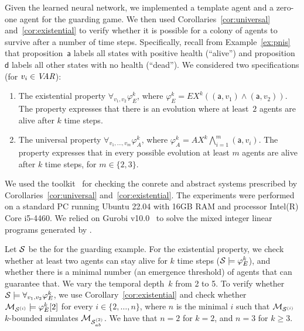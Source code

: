 Given the learned neural network, we implemented a template
agent and a zero-one agent for the guarding game. We then
used Corollaries~\ref{cor:universal}
and~\ref{cor:existential} to verify whether it is possible
for a colony of agents to survive after a number of time
steps.  Specifically, recall from Example~\ref{ex:pnis} that
proposition~$\mathsf{a}$ labels all states with positive
health (``alive'') and proposition $\mathsf{d}$ labels all
other states with no health (``dead'').
We considered two
specifications (for $v_i \in\it{VAR}$):
\begin{enumerate}
    \item The existential property $ \forall_{v_1,
        v_2}\varphi^k_E$, where $\varphi^k_E =   EX^k (
        (\mathsf{a},v_1) \land (\mathsf{a}, v_2))$. The
        property expresses that there is an evolution where
        at least~$2$ agents are alive after $k$ time steps.
\item The universal property $\forall_{v_1,\ldots,v_m}
\varphi^k_A$, where $\varphi^k_A  = AX^k
        \bigwedge_{i=1}^m(\mathsf{a},v_i)$. The property
        expresses that in every possible evolution at least
        $m$ agents are alive after $k$ time steps, for $m
        \in \{2,3\}$.
\end{enumerate}

We used the \venmas toolkit~\cite{Akintunde+20b} for
checking the conrete and abstract systems prescribed by
Corollaries~\ref{cor:universal}
and~\ref{cor:existential}.
The experiments %
were performed on a standard PC running Ubuntu 22.04 with 16GB RAM and
processor Intel(R) Core i5-4460. We relied on Gurobi
v10.0~\cite{Gurobi+16a} to solve the mixed integer linear programs generated by
\venmas.

Let $\mathcal S$ be the
\panos{} for the guarding example. For the existential
property, we check whether at least two agents can stay
alive for $k$ time steps ($\mathcal S\models \varphi^k_E$), and
whether there is a minimal number (an emergence threshold)
of agents that can  guarantee that. We vary the
temporal depth~$k$ from 2 to 5.  
%
To verify whether
$\mathcal S\models\forall_{v_1,v_2}\varphi^k_E$, we use
Corollary~\ref{cor:existential} and check whether
$\mathcal{M}_{\mathcal{S}^{(i)}}\models\varphi^k_E[2]$ for every
$i\in\{2,\dots,n\}$, where $n$ is the minimal $i$ such that
$\mathcal{M}_{\mathcal{S}^{(i)}}$ $k$-bounded simulates $\mathcal{M}_{\mathcal{S}_{ab}^{(2)}}$. We have that 
$n=2$ for $k=2$, and $n=3$ for $k\geq 3$.


